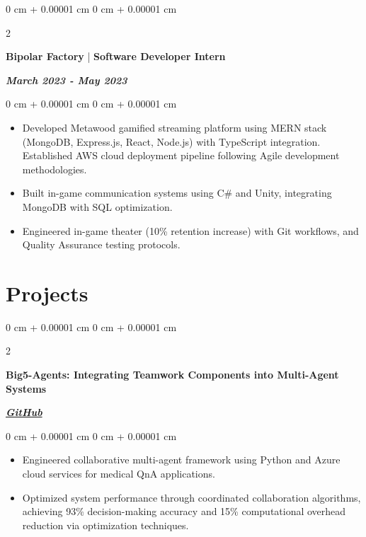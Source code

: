 \documentclass[10pt, letterpaper]{article}
\newenvironment{highlights}{
    \begin{itemize}[
        topsep=0.10 cm,
        parsep=0.10 cm,
        partopsep=0pt,
        itemsep=0pt,
        leftmargin=0 cm + 10pt
    ]
}{
    \end{itemize}
} %
\newenvironment{onecolentry}{
    \begin{adjustwidth}{
        0 cm + 0.00001 cm
    }{
        0 cm + 0.00001 cm
    }
}{
    \end{adjustwidth}
} %
\newenvironment{twocolentry}[2][]{
    \onecolentry
    \def\secondColumn{#2}
    \setcolumnwidth{\fill, 4.5 cm}
    \begin{paracol}{2}
}{
    \switchcolumn \raggedleft \secondColumn
    \end{paracol}
    \endonecolentry
} %
\begin{document}
\begin{twocolentry}{\textit{\textbf{March 2023 - May 2023}}}
   \textbf{Bipolar Factory} | \textbf{Software Developer Intern}
\end{twocolentry}
\vspace{0.10 cm}
\begin{onecolentry}
    \begin{highlights}
\item Developed Metawood gamified streaming platform using MERN stack (MongoDB, Express.js, React, Node.js) with TypeScript integration. Established AWS cloud deployment pipeline following Agile development methodologies.
    \end{highlights}
    \begin{highlights}
\item Built in-game communication systems using C\# and Unity, integrating MongoDB with SQL optimization.
    \end{highlights}
        \begin{highlights}
\item Engineered in-game theater (10\% retention increase) with Git workflows, and Quality Assurance testing protocols.
    \end{highlights}
\end{onecolentry}

\section{Projects}

\begin{twocolentry}{
           \href{https://github.com/PranavMishra17/Big5-Agents}{\textbf{\textit{GitHub}}}
       }
           \textbf{Big5-Agents: Integrating Teamwork Components into Multi-Agent Systems}
\end{twocolentry}
\vspace{0.10 cm}
\begin{onecolentry}
   \begin{highlights}
\item Engineered collaborative multi-agent framework using Python and Azure cloud services for medical QnA applications.
   \end{highlights}
   \begin{highlights}
\item Optimized system performance through coordinated collaboration algorithms, achieving 93\% decision-making accuracy and 15\% computational overhead reduction via optimization techniques.
   \end{highlights}
\end{onecolentry}
\end{document}
